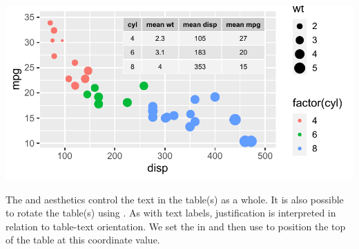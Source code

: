 \documentclass[krantz2]{krantz}\usepackage{knitr}
\begin{document}
\begin{knitrout}\footnotesize
{}\color{fgcolor}\begin{kframe}
\begin{alltt}
\hlstd{(}  \hlstd{(}   
                           \hlstd{=} 
                           
                            \hlopt{+}
  \hlstd{()} \hlopt{+}
  \hlstd{()} \hlopt{+}
  \hlstd{(} 
             \hlstd{(}     
              \hlstd{=} \hlstd{,}  \hlstd{=} \hlstd{)}
\end{alltt}
\end{kframe}

{\centering \includegraphics[width=.7\textwidth]{figure/pos-table-plot-02-1}

}



\end{knitrout}

The  and  aesthetics control the text in the table(s) as a whole.
It is also possible to rotate the table(s) using . As with text labels, justification is interpreted in relation to table-text orientation. We set the  in  and then use  to position the top of the table at this coordinate value.

\begin{knitrout}\footnotesize
{}\color{fgcolor}\begin{kframe}
\begin{alltt}
\hlstd{(}  \hlstd{(}     \hlstd{=}  \hlopt{+}
  \hlstd{()} \hlopt{+}
  \hlstd{(} 
             \hlstd{(}     
              \hlstd{=} \hlstd{,}  \hlstd{=} \hlstd{,}
              \hlstd{=} \hlstd{,}  \hlstd{=} \hlstd{,}  \hlstd{=} \hlstd{)}
\end{alltt}
\end{kframe}
\end{knitrout}
\end{document}
